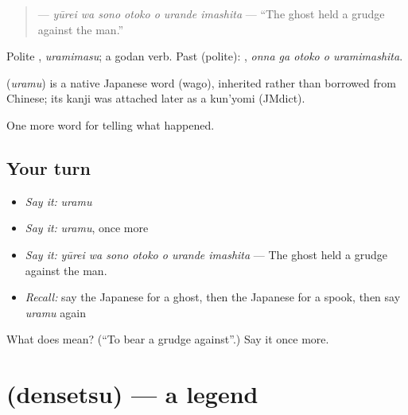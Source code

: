 \begin{quote}
\textbf{   } — \emph{yūrei wa sono otoko o urande imashita} — \textquotedblleft{}The ghost held a grudge against the man.\textquotedblright{}
\end{quote}

Polite \textbf{}, \emph{uramimasu}; a godan verb. Past (polite): \textbf{  }, \emph{onna ga otoko o uramimashita}.

\begin{cousinweb}
\textbf{} (\emph{uramu}) is a native Japanese word (wago), inherited rather than borrowed from Chinese; its kanji was attached later as a kun'yomi (JMdict).
\end{cousinweb}

\begin{grammarlens}[title={What you've built}]
One more word for telling what happened.
\end{grammarlens}

\subsection*{Your turn}
\begin{itemize}
\raggedright
  \item \emph{Say it:} \emph{uramu}
  \item \emph{Say it:} \emph{uramu}, once more
  \item \emph{Say it:} \emph{yūrei wa sono otoko o urande imashita} — The ghost held a grudge against the man.
  \item \emph{Recall:} say the Japanese for a ghost, then the Japanese for a spook, then say \emph{uramu} again
\end{itemize}

\begin{tcolorbox}[breakable,colback=teal!4,colframe=teal!35!black,title={Before you move on}]
What does  mean? (\textquotedblleft{}To bear a grudge against\textquotedblright{}.) Say it once more.
\end{tcolorbox}
\section[\texorpdfstring{\ja{でんせつ} (densetsu)}{でんせつ (densetsu)}]{ (densetsu) — a legend}

\label{lesson:JA-C302-densetsu}



